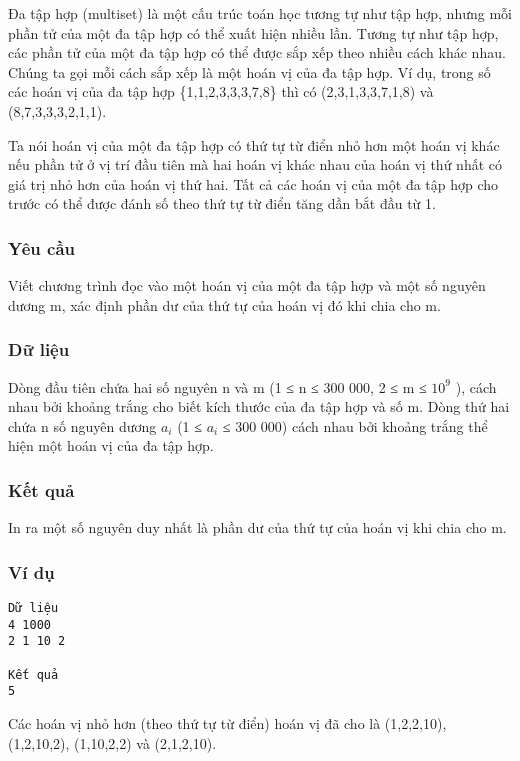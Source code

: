 



   Đa tập hợp (multiset) là một cấu trúc toán học tương tự như tập hợp, nhưng mỗi phần tử của một đa tập hợp có thể xuất hiện nhiều lần. Tương tự như tập hợp, các phần tử của một đa tập hợp có thể được sắp xếp theo nhiều cách khác nhau. Chúng ta gọi mỗi cách sắp xếp là một hoán vị của đa tập hợp. Ví dụ, trong số các hoán vị của đa tập hợp \{1,1,2,3,3,3,7,8\} thì có (2,3,1,3,3,7,1,8) và (8,7,3,3,3,2,1,1).  

   Ta nói hoán vị của một đa tập hợp có thứ tự từ điển nhỏ hơn một hoán vị khác nếu phần tử ở vị trí đầu tiên mà hai hoán vị khác nhau của hoán vị thứ nhất có giá trị nhỏ hơn của hoán vị thứ hai. Tất cả các hoán vị của một đa tập hợp cho trước có thể được đánh số theo thứ tự từ điển tăng dần bắt đầu từ 1.  

\subsubsection{   Yêu cầu  }

   Viết chương trình đọc vào một hoán vị của một đa tập hợp và một số nguyên dương m, xác định phần dư của thứ tự của hoán vị đó khi chia cho m.  

\subsubsection{   Dữ liệu  }

   Dòng đầu tiên chứa hai số nguyên n và m (1 ≤ n ≤ 300 000, 2 ≤ m ≤ $10^{9}$   ), cách nhau bởi khoảng trắng cho biết kích thước của đa tập hợp và số m. Dòng thứ hai chứa n số nguyên dương $a_{i}$   (1 ≤ $a_{i}$   ≤ 300 000) cách nhau bởi khoảng trắng thể hiện một hoán vị của đa tập hợp.  

\subsubsection{   Kết quả  }

   In ra một số nguyên duy nhất là phần dư của thứ tự của hoán vị khi chia cho m.  

\subsubsection{   Ví dụ  }
\begin{verbatim}
Dữ liệu
4 1000 
2 1 10 2 

Kết quả
5
\end{verbatim}

   Các hoán vị nhỏ hơn (theo thứ tự từ điển) hoán vị đã cho là (1,2,2,10), (1,2,10,2), (1,10,2,2) và (2,1,2,10).  

